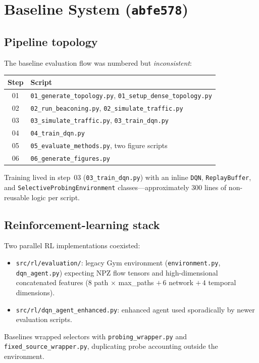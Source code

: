 \documentclass[11pt,a4paper,twoside,openright]{report}
\begin{document}
\chapter{Baseline System (\texttt{abfe578})}

\section{Pipeline topology}

The baseline evaluation flow was numbered but \emph{inconsistent}:
\begin{center}
\begin{tabular}{cl}
\toprule
Step & Script \\
\midrule
01 & \texttt{01\_generate\_topology.py}, \texttt{01\_setup\_dense\_topology.py} \\
02 & \texttt{02\_run\_beaconing.py}, \texttt{02\_simulate\_traffic.py} \\
03 & \texttt{03\_simulate\_traffic.py}, \texttt{03\_train\_dqn.py} \\
04 & \texttt{04\_train\_dqn.py} \\
05 & \texttt{05\_evaluate\_methods.py}, two figure scripts \\
06 & \texttt{06\_generate\_figures.py} \\
\bottomrule
\end{tabular}
\end{center}
Training lived in step~03 (\texttt{03\_train\_dqn.py}) with an inline
\texttt{DQN}, \texttt{ReplayBuffer}, and \texttt{SelectiveProbingEnvironment}
classes---approximately 300 lines of non-reusable logic per script.

\section{Reinforcement-learning stack}

Two parallel RL implementations coexisted:
\begin{itemize}
  \item \texttt{src/rl/evaluation/}: legacy Gym environment
    (\texttt{environment.py}, \texttt{dqn\_agent.py}) expecting NPZ flow tensors
    and high-dimensional concatenated features ($8$ path $\times$ max\_paths
    $+\,6$ network $+\,4$ temporal dimensions).
  \item \texttt{src/rl/dqn\_agent\_enhanced.py}: enhanced agent used sporadically
    by newer evaluation scripts.
\end{itemize}
Baselines wrapped selectors with \texttt{probing\_wrapper.py} and
\texttt{fixed\_source\_wrapper.py}, duplicating probe accounting outside the
environment.
\end{document}
